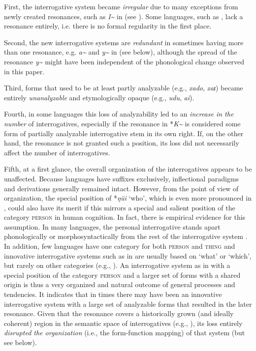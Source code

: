 \documentclass[output=paper,hidelinks]{langscibook}
\begin{document}
First, the interrogative system became \textit{irregular} due to many exceptions from newly created resonances, such as \textit{I\textasciitilde} in  (see ). Some languages, such as , lack a resonance entirely, i.e. there is no formal regularity in the first place.

Second, the new interrogative systems are \textit{redundant} in sometimes having more than one resonance, e.g. \textit{a\textasciitilde} and \textit{y\textasciitilde} in  (see below), although the spread of the resonance \textit{y\textasciitilde} might have been independent of the phonological change observed in this paper.

Third, forms that used to be at least partly analyzable (e.g.,  \textit{xado}, \textit{xaɪ}) became entirely \textit{unanalyzable} and etymologically opaque (e.g.,  \textit{udu}, \textit{ai}).

Fourth, in some languages this loss of analyzability led to an \textit{increase in the number} of interrogatives, especially if the resonance in *\textit{K\textasciitilde} is considered some form of partially analyzable interrogative stem in its own right. If, on the other hand, the resonance is not granted such a position, its loss did not necessarily affect the number of interrogatives.

Fifth, at a first glance, the overall organization of the interrogatives appears to be unaffected. Because  languages have suffixes exclusively, inflectional paradigms and derivations generally remained intact. However, from the point of view of organization, the special position of  *\textit{ŋüi} `who', which is even more pronounced in , could also have its merit if this mirrors a special and salient position of the category \textsc{person} in human cognition. In fact, there is empirical evidence for this assumption. In many languages, the personal interrogative stands apart phonologically or morphosyntactically from the rest of the interrogative system \citep[406]{Hölzl2018b}. In addition, few languages have one category for both \textsc{person} and \textsc{thing} and innovative interrogative systems such as in  are usually based on `what' or `which', but rarely on other categories (e.g., \citealt{Cysouw2007}). An interrogative system as in  with a special position of the category \textsc{person} and a larger set of forms with a shared origin is thus a very organized and natural outcome of general processes and tendencies. It indicates that in  times there may have been an innovative interrogative system with a large set of analyzable forms that resulted in the later resonance. Given that the resonance covers a historically grown (and ideally coherent) region in the semantic space of interrogatives (e.g., \citealt{Cysouw2005,Hölzl2018b}), its loss entirely \textit{disrupted the organization} (i.e., the form-function mapping) of that system (but see below).
\end{document}
